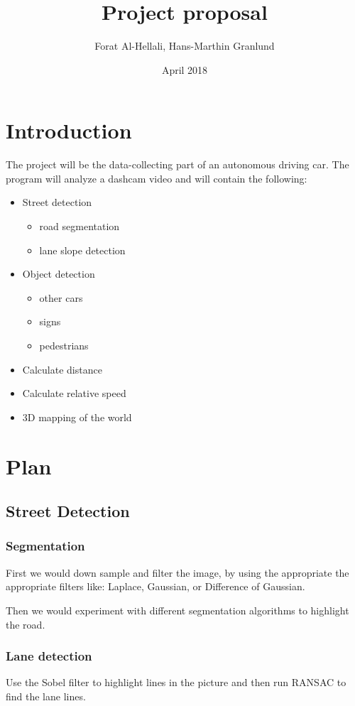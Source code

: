 \documentclass{article}
\title{Project proposal}
\author{Forat Al-Hellali, Hans-Marthin Granlund }
\date{April 2018}
\begin{document}
\maketitle

\section{Introduction}
The project will be the data-collecting part of an autonomous driving car. The program will analyze a dashcam video and will contain the following:
\begin{itemize}
    \item Street detection
        \begin{itemize}
            \item road segmentation
            \item lane slope detection
        \end{itemize}
    \item Object detection
        \begin{itemize}
            \item other cars
            \item signs
            \item pedestrians
        \end{itemize}
    \item Calculate distance
    \item Calculate relative speed
    \item 3D mapping of the world
\end{itemize}

\section{Plan}
\subsection{Street Detection}
\subsubsection{Segmentation}
First we would down sample and filter the image, by using the appropriate the appropriate filters like: Laplace, Gaussian, or Difference of Gaussian.

Then we would experiment with different segmentation algorithms to highlight the road.

\subsubsection{Lane detection}
Use the Sobel filter to highlight lines in the picture and then run RANSAC to find the lane lines.
\end{document}
